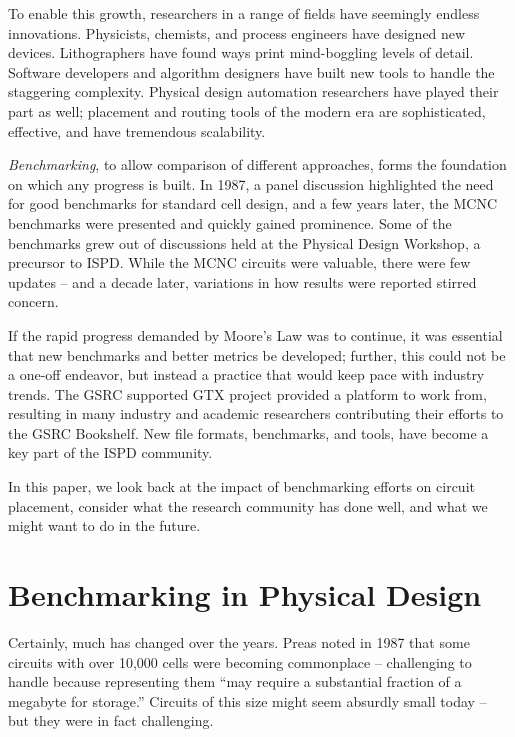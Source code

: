 \documentclass[sigconf]{acmart}
\begin{document}

To enable this growth, researchers in a range of fields have
seemingly endless innovations.  Physicists,
chemists, and process engineers have designed new devices. Lithographers
have found ways print mind-boggling levels of detail. Software developers
and algorithm designers have built new tools to handle the staggering
complexity. 
Physical design automation researchers have played their part as well;
placement and routing tools of the modern era are sophisticated, effective,
and have tremendous scalability.

{\em Benchmarking}, to allow comparison of different approaches,
forms the foundation on which any progress is built.
In 1987, a panel discussion\cite{Preas87}
highlighted the need for good benchmarks for standard cell
design, and a few years later, the MCNC benchmarks\cite{Kozminski91}
were presented and quickly gained prominence.  Some of the benchmarks
grew out of discussions held at the Physical Design Workshop,
a precursor to ISPD.
While the
MCNC circuits were valuable, there were few updates -- and a
decade later, variations in how results were reported
stirred concern\cite{Madden010030}.

If the rapid progress demanded by Moore's Law was to continue, it
was essential that new benchmarks and better metrics be developed;
further, this could not be a one-off endeavor, but instead a
practice that would keep pace with industry trends.  The
GSRC supported GTX project
\cite{Caldwell000693} provided a platform to work from,
resulting in many industry and academic researchers
contributing their efforts to the GSRC Bookshelf\cite{umichbookshelf}.
New file formats, benchmarks, and tools, have become
a key part of the ISPD community.

In this paper, we look back at the impact of benchmarking
efforts on circuit placement, consider what the research
community has done well, and what
we might want to do in the future.


\section{Benchmarking in Physical Design}

Certainly, much has changed over the years.  Preas\cite{Preas87}
noted in 1987 that some circuits with over 10,000 cells were becoming
commonplace -- challenging to handle because representing them
``may require a substantial fraction of a megabyte for storage.''
Circuits of this size might seem absurdly small today -- but they
were in fact challenging.
\end{document}
